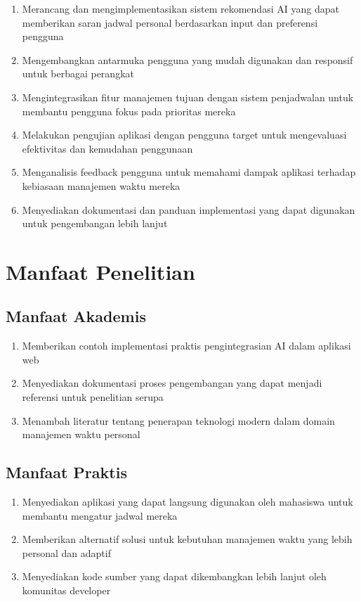 \begin{enumerate}
\item Merancang dan mengimplementasikan sistem rekomendasi AI yang dapat memberikan saran jadwal personal berdasarkan input dan preferensi pengguna

\item Mengembangkan antarmuka pengguna yang mudah digunakan dan responsif untuk berbagai perangkat

\item Mengintegrasikan fitur manajemen tujuan dengan sistem penjadwalan untuk membantu pengguna fokus pada prioritas mereka

\item Melakukan pengujian aplikasi dengan pengguna target untuk mengevaluasi efektivitas dan kemudahan penggunaan

\item Menganalisis feedback pengguna untuk memahami dampak aplikasi terhadap kebiasaan manajemen waktu mereka

\item Menyediakan dokumentasi dan panduan implementasi yang dapat digunakan untuk pengembangan lebih lanjut
\end{enumerate}

\section{Manfaat Penelitian}

\subsection{Manfaat Akademis}

\begin{enumerate}
\item Memberikan contoh implementasi praktis pengintegrasian AI dalam aplikasi web
\item Menyediakan dokumentasi proses pengembangan yang dapat menjadi referensi untuk penelitian serupa
\item Menambah literatur tentang penerapan teknologi modern dalam domain manajemen waktu personal
\end{enumerate}

\subsection{Manfaat Praktis}

\begin{enumerate}
\item Menyediakan aplikasi yang dapat langsung digunakan oleh mahasiswa untuk membantu mengatur jadwal mereka
\item Memberikan alternatif solusi untuk kebutuhan manajemen waktu yang lebih personal dan adaptif
\item Menyediakan kode sumber yang dapat dikembangkan lebih lanjut oleh komunitas developer
\end{enumerate}

